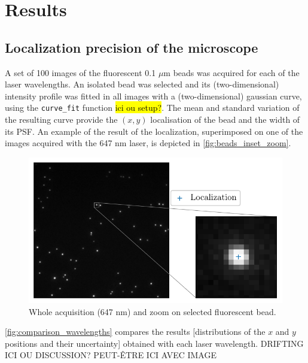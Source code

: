 \section{Results}
\subsection{Localization precision of the microscope}
A set of 100 images of the fluorescent 0.1 $\mu$m beads was acquired for each of the laser wavelengths.
An isolated bead was selected and its (two-dimensional) intensity profile was fitted in all images with a (two-dimensional) gaussian curve, using the \verb|curve_fit|  function \hl{ici ou setup?}. 
The mean and standard variation of the resulting curve provide the $(x,y)$ localisation of the bead and the width of its PSF.
An example of the result of the localization, superimposed on one of the images acquired with the 647 nm laser, is depicted in \autoref{fig:beads_inset_zoom}.


\begin{figure}[htbp]
    \centering
    \includegraphics[scale=1]{figures/beads_inset_zoom.pdf}
    \caption{Whole acquisition (647 nm) and zoom on selected fluorescent bead.}
    \label{fig:beads_inset_zoom}
\end{figure}

\autoref{fig:comparison_wavelengths} compares the results [distributions of the $x$ and $y$ positions and their uncertainty] obtained with each laser wavelength.
DRIFTING ICI OU DISCUSSION? PEUT-ÊTRE ICI AVEC IMAGE

